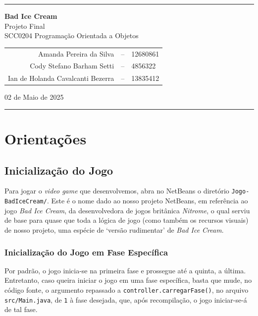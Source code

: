 \documentclass[12pt,a4paper,portuguese]{article}
\begin{document}
    \vspace{5mm}
    \rule{0.95\textwidth}{1pt}
    \vspace{3mm}
    \begin{center}
        \textbf{\huge Bad Ice Cream} \\
        \Large Projeto Final \\
        \large SCC0204 Programação Orientada a Objetos
    
        \vspace{8mm}
        \begin{tabular}{rcl}
            Amanda Pereira da Silva &-- &12680861 \\
            Cody Stefano Barham Setti &-- &4856322 \\
            Ian de Holanda Cavalcanti Bezerra &-- &13835412
        \end{tabular}

    \vspace{8mm}
    02 de Maio de 2025
    \end{center}

    \vspace{1mm}
    \rule{0.95\textwidth}{1pt}
    \vspace{0.5cm}

    \section{Orientações}
    \subsection{Inicialização do Jogo}
        Para jogar o \emph{video game} que desenvolvemos, abra no NetBeans o diretório \verb|Jogo-BadIceCream/|. Este é o nome dado ao nosso projeto NetBeans, em referência ao jogo \emph{Bad Ice Cream}, da desenvolvedora de jogos britânica \emph{Nitrome}, o qual serviu de base para quase que toda a lógica de jogo (como também os recursos visuais) de nosso projeto, uma espécie de `versão rudimentar' de \emph{Bad Ice Cream}.

    \subsubsection{Inicialização do Jogo em Fase Específica}
        Por padrão, o jogo inicia-se na primeira fase e prossegue até a quinta, a última. Entretanto, caso queira iniciar o jogo em uma fase específica, basta que mude, no código fonte, o argumento repassado a \verb|controller.carregarFase()|, no arquivo \verb|src/Main.java|, de \verb|1| à fase desejada, que, após recompilação, o jogo iniciar-se-á de tal fase.
        
\end{document}
